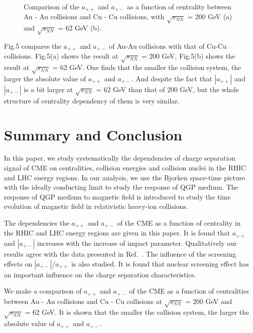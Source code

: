 \documentclass[twocolumn,showpacs,preprintnumbers,amsmath,amssymb]{revtex4}
\begin{document}
\begin{figure}[h!]
\centering {}
\caption{Comparison of the $a_{++}$ and $a_{+-}$ as a function of centrality between Au - Au collisions and Cu - Cu collisions, with $\sqrt{s_{NN}}$ = 200 GeV (a) and $\sqrt{s_{NN}}$ = 62 GeV (b). }

\label{fig5} %
\end{figure}

Fig.5 compares the $a_{++}$ and $a_{+-}$ of Au-Au collisions with that of Cu-Cu collisions. Fig.5(a) shows the result at $\sqrt{s_{NN}}$ = 200 GeV, Fig.5(b) shows the result at $\sqrt{s_{NN}}$ = 62 GeV. One finds that the smaller the collision system, the larger the absolute value of $a_{++}$ and $a_{+-}$. And despite the fact that $|a_{++}|$ and $|a_{+-}|$ is a bit larger at $\sqrt{s_{NN}}$ = 62 GeV than that of 200 GeV, but the whole structure of centrality dependency of them is very similar.



\section{Summary and Conclusion}
In this paper, we study systematically the dependencies of charge separation signal of CME on centralities, collision energies and collision nuclei in the RHIC and LHC energy regions. In our analysis, we use the Bjorken space-time picture with the ideally conducting limit to study the response of QGP medium. The response of QGP medium to magnetic field is introduced to study the time evolution of magnetic field in relativistic heavy-ion collisions. 

The dependencies the $a_{++}$ and $a_{+-}$ of the CME as a function of centrality in the RHIC and LHC energy regions are given in this paper. It is found that $a_{++}$ and $|a_{+-}|$ increases with the increase of impact parameter.  Qualitatively our results agree with the data presented in Ref.~\cite{lab8,lab9,lab10,lab11}. The influence of the screening effects on $|a_{+-}|/a_{++}$ is also studied. It is found that nuclear screening effect has an important influence on the charge separation characteristics.

We make a comparison of $a_{++}$ and $a_{+-}$ of the CME as a function of centralities between Au - Au collisions and Cu - Cu collisions at $\sqrt{s_{NN}}$ = 200 GeV and $\sqrt{s_{NN}}$ = 62 GeV. It is shown that the smaller the collision system, the larger the absolute value of $a_{++}$ and $a_{+-}$.
\end{document}
